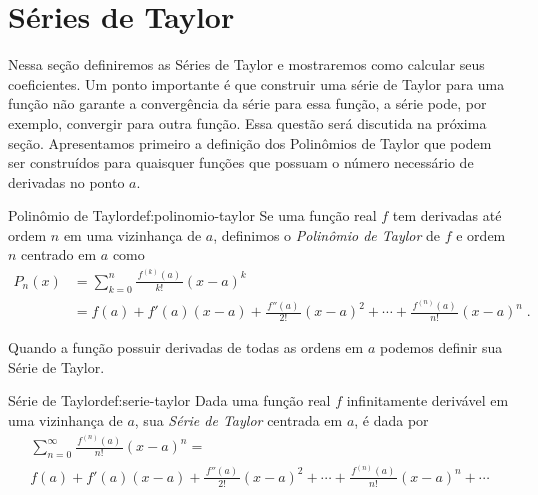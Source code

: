 \section{Séries de Taylor}

Nessa seção definiremos as Séries de Taylor e mostraremos como calcular seus coeficientes.
Um ponto importante é que construir uma série de Taylor para uma função não garante
a convergência da série para essa função, a série pode, por exemplo,
convergir para outra função. Essa questão será discutida na próxima seção.
Apresentamos primeiro a definição dos Polinômios de Taylor que podem ser
construídos para quaisquer funções que possuam o número necessário
de derivadas no ponto $a$.

\begin{definicao}{Polinômio de Taylor}{def:polinomio-taylor}
	Se uma função real $f$ tem derivadas até ordem $n$ em uma vizinhança de $a$,
	definimos o
	\emph{Polinômio de Taylor}
  de $f$ e ordem $n$ centrado em $a$ como
	\begin{align*}
	  P_n(x) & = \sum_{k=0}^n \frac{\,f^{(k)}(a)\,}{k!}(x-a)^k \\[3mm]
	         & = f(a)
             + f'(a)(x-a)
             + \frac{\,f''(a)\,}{2!}(x-a)^2
             + \cdots
             + \frac{\,f^{(n)}(a)\,}{n!}(x-a)^n     \;.
	\end{align*}
\end{definicao}

Quando a função possuir derivadas de todas as ordens em $a$ podemos definir sua Série de Taylor.

\begin{definicao}{Série de Taylor}{def:serie-taylor}
  Dada uma função real $f$ infinitamente derivável em uma vizinhança de $a$,
  sua \emph{Série de Taylor}
  centrada em $a$, é dada por
  \begin{multline*}
    \sum_{n=0}^\infty \frac{\,f^{(n)}(a)\,}{n!}(x-a)^n = \\
     f(a) +
     f'(a)(x-a) +
     \frac{\,f''(a)\,}{2!}(x-a)^2 +
     \cdots +
     \frac{\,f^{(n)}(a)\,}{n!}(x-a)^n +
     \cdots
  \end{multline*}
\end{definicao}

